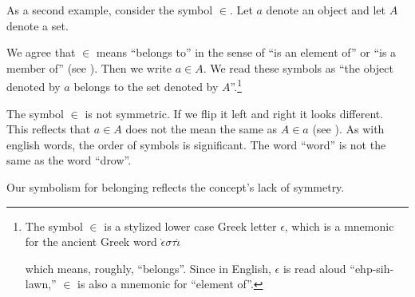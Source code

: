 As a second example, consider the symbol $\in$.
Let $a$ denote an object and let $A$ denote a set.
%  

We agree that $\in$ means ``belongs to'' in the sense of ``is an element of'' or ``is a member of'' (see ).
Then we write $a \in A$.
We read these symbols as ``the object denoted by $a$ belongs to the set denoted by $A$''.\footnote{The symbol $\in$ is a stylized lower case Greek letter $\epsilon $, which is a mnemonic for the ancient Greek word $\grave{\epsilon} \sigma \tau \acute{\iota}$

which means, roughly, ``belongs''.
Since in English, $\epsilon $ is read aloud ``ehp-sih-lawn,'' $\in$ is also a mnemonic for ``element of''.}

The symbol $\in$ is not symmetric.
If we flip it left and right it looks different.
This reflects that $a \in A$ does not the mean the same as $A \in a$ (see ).
As with english words, the order of symbols is significant.
The word ``word'' is not the same as the word ``drow''.
%  

Our symbolism for belonging reflects the concept's lack of symmetry.

